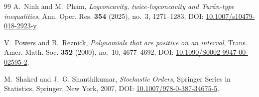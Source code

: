 \documentclass[11pt,a4paper]{amsart}
\numberwithin{equation}{section}
\theoremstyle{plain}
\theoremstyle{definition}
\begin{document}
\begin{thebibliography}{99}
A.~Ninh and M.~Pham,
\emph{Logconcavity, twice-logconcavity and Tur\'an-type inequalities},
Ann. Oper. Res. \textbf{354} (2025), no.~3, 1271--1283,
DOI: \href{https://doi.org/10.1007/s10479-018-2923-y}{10.1007/s10479-018-2923-y}.

V.~Powers and B.~Reznick,
\emph{Polynomials that are positive on an interval},
Trans. Amer. Math. Soc. \textbf{352} (2000), no.~10, 4677--4692,
DOI: \href{https://doi.org/10.1090/S0002-9947-00-02595-2}{10.1090/S0002-9947-00-02595-2}.


M.~Shaked and J.~G. Shanthikumar,
\emph{Stochastic Orders},
Springer Series in Statistics, Springer, New York, 2007,
DOI: \href{https://doi.org/10.1007/978-0-387-34675-5}{10.1007/978-0-387-34675-5}.

\end{thebibliography}
\end{document}
